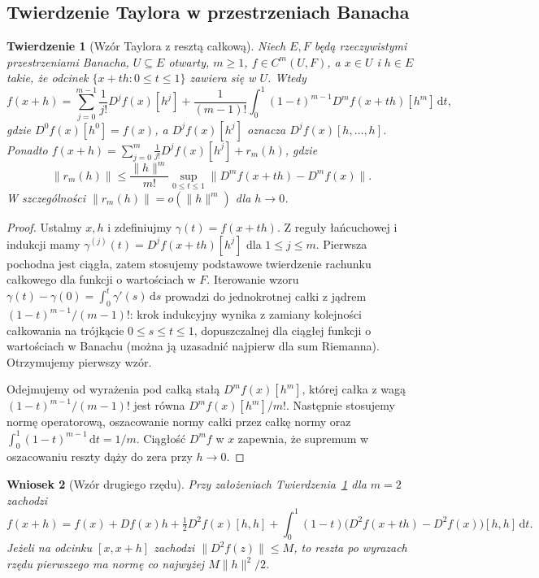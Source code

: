 \documentclass[11pt,a4paper]{article}
\numberwithin{equation}{section}
\theoremstyle{plain}
\newtheorem{twierdzenie}{Twierdzenie}[section]
\newtheorem{wniosek}[twierdzenie]{Wniosek}
\theoremstyle{definition}
\theoremstyle{remark}
\begin{document}
\subsection{Twierdzenie Taylora w przestrzeniach Banacha}

\begin{twierdzenie}[Wzór Taylora z resztą całkową]
\label{thm:taylor15}
Niech $E,F$ będą rzeczywistymi przestrzeniami Banacha, $U\subseteq E$ otwarty, $m\ge1$, $f\in C^m(U,F)$, a $x\in U$ i $h\in E$ takie, że odcinek $\{x+th:0\le t\le1\}$ zawiera się w $U$. Wtedy
\[
 f(x+h)=\sum_{j=0}^{m-1}\frac1{j!}D^jf(x)[h^j]
 +\frac1{(m-1)!}\int_0^1(1-t)^{m-1}D^mf(x+th)[h^m] \,\mathrm dt,
\]
gdzie $D^0f(x)[h^0]=f(x)$, a $D^jf(x)[h^j]$ oznacza $D^jf(x)[h,\ldots,h]$. Ponadto
$f(x+h)=\sum_{j=0}^{m}\frac1{j!}D^jf(x)[h^j]+r_m(h)$, gdzie
\[
\|r_m(h)\|\le \frac{\|h\|^m}{m!}\sup_{0\le t\le1}\|D^mf(x+th)-D^mf(x)\|.
\]
W szczególności $\|r_m(h)\|=o(\|h\|^m)$ dla $h\to0$.
\end{twierdzenie}
\begin{proof}
Ustalmy $x,h$ i zdefiniujmy $\gamma(t)=f(x+th)$. Z reguły łańcuchowej i indukcji mamy $\gamma^{(j)}(t)=D^jf(x+th)[h^j]$ dla $1\le j\le m$. Pierwsza pochodna jest ciągła, zatem stosujemy podstawowe twierdzenie rachunku całkowego dla funkcji o wartościach w $F$. Iterowanie wzoru $\gamma(t)-\gamma(0)=\int_0^t\gamma'(s)\,\mathrm ds$ prowadzi do jednokrotnej całki z jądrem $(1-t)^{m-1}/(m-1)!$: krok indukcyjny wynika z zamiany kolejności całkowania na trójkącie $0\le s\le t\le1$, dopuszczalnej dla ciągłej funkcji o wartościach w Banachu (można ją uzasadnić najpierw dla sum Riemanna). Otrzymujemy pierwszy wzór.

Odejmujemy od wyrażenia pod całką stałą $D^mf(x)[h^m]$, której całka z wagą $(1-t)^{m-1}/(m-1)!$ jest równa $D^mf(x)[h^m]/m!$. Następnie stosujemy normę operatorową, oszacowanie normy całki przez całkę normy oraz $\int_0^1(1-t)^{m-1}\,\mathrm dt=1/m$. Ciągłość $D^mf$ w $x$ zapewnia, że supremum w oszacowaniu reszty dąży do zera przy $h\to0$.
\end{proof}

\begin{wniosek}[Wzór drugiego rzędu]
\label{cor:taylor2-15}
Przy założeniach Twierdzenia~\ref{thm:taylor15} dla $m=2$ zachodzi
\[
 f(x+h)=f(x)+Df(x)h+\tfrac12D^2f(x)[h,h]
 +\int_0^1(1-t)\bigl(D^2f(x+th)-D^2f(x)\bigr)[h,h] \,\mathrm dt.
\]
Jeżeli na odcinku $[x,x+h]$ zachodzi $\|D^2f(z)\|\le M$, to reszta po wyrazach rzędu pierwszego ma normę co najwyżej $M\|h\|^2/2$.
\end{wniosek}
\end{document}
